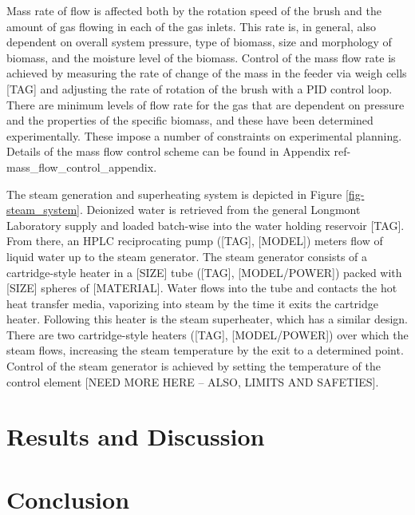 \documentclass[11pt,twocolumn]{article}
\begin{document}
Mass rate of flow is affected both by the rotation speed of the brush and the amount of gas flowing in each of the gas inlets.  This rate is, in general, also dependent on overall system pressure, type of biomass, size and morphology of biomass, and the moisture level of the biomass.  Control of the mass flow rate is achieved by measuring the rate of change of the mass in the feeder via weigh cells [TAG] and adjusting the rate of rotation of the brush with a PID control loop.  There are minimum levels of flow rate for the gas that are dependent on pressure and the properties of the specific biomass, and these have been determined experimentally.  These impose a number of constraints on experimental planning.  Details of the mass flow control scheme can be found in Appendix {ref-mass_flow_control_appendix}.  

 The steam generation and superheating system is depicted in Figure \ref{fig-steam_system}.  Deionized water is retrieved from the general Longmont Laboratory supply and loaded batch-wise into the water holding reservoir [TAG].  From there, an HPLC reciprocating pump ([TAG], [MODEL]) meters flow of liquid water up to the steam generator.  The steam generator consists of a cartridge-style heater in a [SIZE] tube ([TAG], [MODEL/POWER]) packed with [SIZE] spheres of [MATERIAL].  Water flows into the tube and contacts the hot heat transfer media, vaporizing into steam by the time it exits the cartridge heater.  Following this heater is the steam superheater, which has a similar design.  There are two cartridge-style heaters ([TAG], [MODEL/POWER]) over which the steam flows, increasing the steam temperature by the exit to a determined point.  Control of the steam generator is achieved by setting the temperature of the control element [NEED MORE HERE -- ALSO, LIMITS AND SAFETIES].




\section*{Results and Discussion}



\section*{Conclusion}



\newpage
\appendix
\onecolumn
\end{document}
